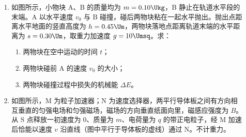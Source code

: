 \documentclass[\gkver]{gaokaozhenti}
\begin{document}
\begin{enumerate}
{（4）刚闭合开关时，灯丝温度较低，电阻较小，电流较大；随着灯丝温度升高，电阻逐渐增大，电流逐渐减小；当灯丝发热与散热平衡时，温度不变，电阻不变，电流保持不变。
}

\item
如图所示，小物块 A、B 的质量均为 $m = 0.10\Ukg$，B 静止在轨道水平段的末端。A 以水平速度 $v_{0}$ 与 B 碰撞，碰后两物块粘在一起水平抛出。抛出点距离水平地面的竖直高度为 $h = 0.45\Um$，两物块落地点距离轨道末端的水平距离为 $s = 0.30\Um$，取重力加速度 $g = 10\Umsq$。求：

\begin{enumerate}
	\item
	两物块在空中运动的时间 $t$；
	\item
	两物块碰前 A 的速度 $v_{0}$ 的大小；
	\item
	两物块碰撞过程中损失的机械能 $\Delta E$。
\end{enumerate}

\jdanswer{
\begin{enumerate}
	\item
	$0.30\Us$

	\item
	$2.0\Ums$

	\item
	$0.10\UJ$

\end{enumerate}
}

\item
如图所示，M 为粒子加速器；N 为速度选择器，两平行导体板之间有方向相互垂直的匀强电场和匀强磁场，磁场的方向垂直纸面向里，磁感应强度为 $B$。从 S 点释放一初速度为 0、质量为 $m$、电荷量为 $q$ 的带正电粒子，经 M 加速后恰能以速度 $v$ 沿直线（图中平行于导体板的虚线）通过 N。不计重力。


\end{enumerate}
\end{document}
